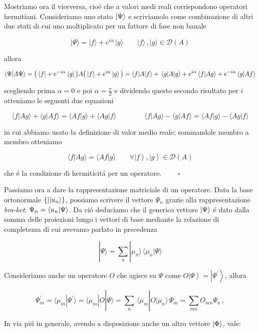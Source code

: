 \begin{enumerate}
	Mostriamo ora il viceversa, cio\'e che a valori medi reali corrispondono operatori hermitiani. Consideriamo uno stato $\normalsize| \Psi \normalsize\rangle$ e scriviamolo come combinazione di altri due stati di cui uno moltiplicato per un fattore di fase non banale
	
	$$|\Psi\rangle=|f\rangle+e^{i\alpha}\,|g\rangle\qquad|f\rangle\,,|g\rangle\in{\mathcal{D}}(A)$$
	
	allora
	
	$$\langle\Psi|A\Psi\rangle=\big{(}\,\langle f|+e^{-i\alpha}\,\langle g|\,\big{)}A\big{(}\,|f\rangle+e^{i\alpha}\,|g\rangle\,\big{)}=\langle f|A|f\rangle+\,\langle g|A|g\rangle+e^{i\alpha}\,\langle f|Ag\rangle+e^{-i\alpha}\,\langle g|Af\rangle$$
	
	scegliendo prima $\alpha = 0$ e poi $\alpha = \frac{\pi}{2}$ e dividendo questo secondo risultato per $i$ otteniamo le seguenti due equazioni
	
	$$\langle f|A g\rangle+\langle g|A f\rangle=\langle A f|g\rangle+\langle A g|f\rangle \qquad\qquad \langle f|A g\rangle-\langle g|A f\rangle=\langle A f|g\rangle-\langle A g|f\rangle$$
	
	in cui abbiamo usato la definizione di valor medio reale; sommandole membro a membro otteniamo
	
	$$\langle f|A g\rangle=\langle A f|g\rangle\qquad\forall\left|f\right\rangle,\left|g\right\rangle\in{\mathcal{D}}(A)$$
	
	che \'e la condizione di hermiticit\'a per un operatore. $\qquad\square$
\end{enumerate}

Passiamo ora a dare la rappresentazione matriciale di un operatore. Data la base ortonormale $\{|\normalsize| u_n \normalsize\rangle\}$, possiamo scrivere il vettore $\Psi_n$ grazie alla rappresentazione \textit{bra-ket}: $\Psi_n = \normalsize\langle u_n \normalsize| \Psi \normalsize\rangle$. Da ci\'o deduciamo che il generico vettore $\normalsize| \Psi \normalsize\rangle$ \'e dato dalla somma delle proiezioni lungo i vettori di base mediante la relazione di completezza di cui avevamo parlato in precedenza

$$|\Psi\rangle=\sum_{n}|\mu_{n}\rangle\,\langle\mu_{n}|\Psi\rangle$$

Consideriamo anche un operatore $O$ che agisce su $\Psi$ come $O\left|\Psi\right\rangle=\left|\Psi^{\prime}\right\rangle$, allora

$$\Psi_{m}^{\prime}=\langle\mu_{m}|\Psi^{\prime}\rangle=\langle\mu_{m}|O|\Psi\rangle=\sum_{n}\,\langle\mu_{m}|O|\mu_{n}\rangle\,\Psi_{m}=\sum_{m n}O_{m n}\Psi_{n}\,,$$

In via pi\'u in generale, avendo a disposizione anche un altro vettore $\normalsize| \Phi \normalsize\rangle$, vale:

